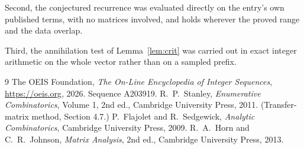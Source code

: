 \documentclass[11pt,a4paper]{article}
\theoremstyle{plain}
\theoremstyle{definition}
\begin{document}
Second, the conjectured recurrence was evaluated directly on the entry's own published terms,
with no matrices involved, and holds wherever the proved range and the data overlap.

Third, the annihilation test of Lemma~\ref{lem:crit} was carried out in exact integer
arithmetic on the whole vector rather than on a sampled prefix.

\begin{thebibliography}{9}
 The OEIS Foundation, \emph{The On-Line Encyclopedia of Integer
Sequences}, \url{https://oeis.org}, 2026. Sequence A203919.
 R.~P.~Stanley, \emph{Enumerative Combinatorics}, Volume 1, 2nd ed.,
Cambridge University Press, 2011. (Transfer-matrix method, Section 4.7.)
 P.~Flajolet and R.~Sedgewick, \emph{Analytic Combinatorics}, Cambridge
University Press, 2009.
 R.~A.~Horn and C.~R.~Johnson, \emph{Matrix Analysis}, 2nd ed., Cambridge
University Press, 2013.
\end{thebibliography}
\end{document}

